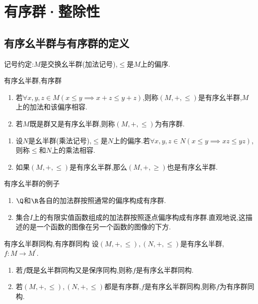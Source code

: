 \chapter{有序群·整除性}

\section{有序幺半群与有序群的定义}

记号约定:$M$是交换幺半群(加法记号),$\leqslant$是$M$上的偏序.

\begin{definition}{有序幺半群,有序群}{}
	\begin{enumerate}
		\item 若$\forall x,y,z\in M\left(x\leqslant y\implies x+z\leqslant y+z\right)$,则称$\left(M,+,\leq\right)$是有序幺半群,$M$上的加法和该偏序相容.
		\item 若$M$既是群又是有序幺半群,则称$\left(M,+,\leq\right)$为有序群.
	\end{enumerate}
\end{definition}

\begin{remark}{}{}
	\begin{enumerate}
		\item 设$N$是幺半群(乘法记号),$\leq$是$N$上的偏序.若$\forall x,y,z\in N\left(x\leq y\implies xz\leq yz\right)$,则称$\leq$和$N$上的乘法相容.
		\item 如果$\left(M,+,\leq\right)$是有序幺半群,那么$\left(M,+,\geq\right)$也是有序幺半群.
	\end{enumerate}
\end{remark}

\begin{example}{有序幺半群的例子}{}
	\begin{enumerate}
		\item $\Q$和$\R$各自的加法群按照通常的偏序构成有序群.
		\item 集合$I$上的有限实值函数组成的加法群按照逐点偏序构成有序群.直观地说,这描述的是一个函数的图像在另一个函数的图像的下方.
	\end{enumerate}
\end{example}


\begin{definition}{有序幺半群同构,有序群同构}{}
	设$\left(M,+,\leq\right),\left(N,+,\leq\right)$是有序幺半群,$f:M\to M^{\prime}$.
	\begin{enumerate}
		\item 若$f$既是幺半群同构又是保序同构,则称$f$是有序幺半群同构.
		\item 若$\left(M,+,\leq\right),\left(N,+,\leq\right)$都是有序群,$f$是有序幺半群同构,则称$f$为有序群同构.
	\end{enumerate}
\end{definition}

